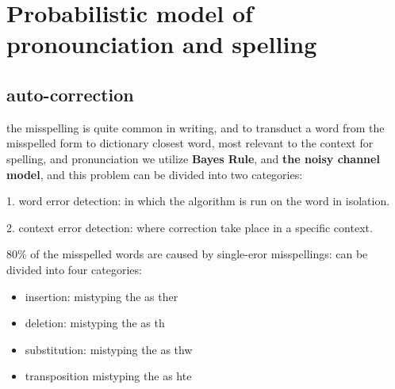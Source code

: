 \documentclass[4apaper,12pt]{book}
\begin{document}
\section{Probabilistic model of pronounciation and spelling}
\begin{description}
  \subsection{auto-correction}
\item the misspelling is quite common in writing, and to transduct a word from the misspelled form to dictionary closest word, most relevant to the context for spelling, and pronunciation we utilize \textbf{Bayes Rule}, and \textbf{the noisy channel model}, and this problem can be divided into two categories:
\item 1. word error detection: in which the algorithm is run on the word in isolation.
\item 2. context error detection: where correction take place in a specific context.
\item 80\% of the misspelled words are caused by single-eror misspellings: can be divided into four categories:
  \begin{itemize}
  \item insertion: mistyping the as ther
  \item deletion: mistyping the as th
  \item substitution: mistyping the as thw
  \item transposition mistyping the as hte
  \end{itemize}

\end{description}
\end{document}
